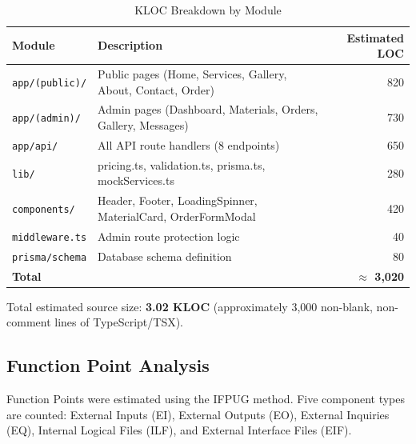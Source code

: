 \documentclass[12pt, a4paper]{article}
\begin{document}
\begin{table}[H]
\centering
\caption{KLOC Breakdown by Module}
\begin{tabularx}{\textwidth}{lXr}
\toprule
\textbf{Module} & \textbf{Description} & \textbf{Estimated LOC} \\
\midrule
\texttt{app/(public)/}  & Public pages (Home, Services, Gallery, About, Contact, Order) & 820 \\
\texttt{app/(admin)/}   & Admin pages (Dashboard, Materials, Orders, Gallery, Messages) & 730 \\
\texttt{app/api/}       & All API route handlers (8 endpoints) & 650 \\
\texttt{lib/}           & pricing.ts, validation.ts, prisma.ts, mockServices.ts & 280 \\
\texttt{components/}    & Header, Footer, LoadingSpinner, MaterialCard, OrderFormModal & 420 \\
\texttt{middleware.ts}  & Admin route protection logic & 40 \\
\texttt{prisma/schema}  & Database schema definition & 80 \\
\midrule
\textbf{Total} & & \textbf{$\approx$ 3,020} \\
\bottomrule
\end{tabularx}
\end{table}

Total estimated source size: \textbf{3.02 KLOC} (approximately 3,000 non-blank, non-comment lines of TypeScript/TSX).

\subsection{Function Point Analysis}

Function Points were estimated using the IFPUG method. Five component types are counted: External Inputs (EI), External Outputs (EO), External Inquiries (EQ), Internal Logical Files (ILF), and External Interface Files (EIF).
\end{document}
